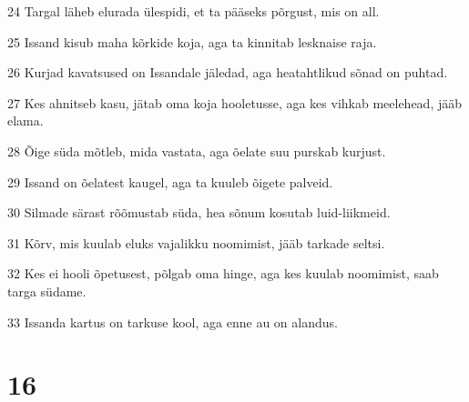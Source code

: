 \par 24 Targal läheb elurada ülespidi, et ta pääseks põrgust, mis on all.
\par 25 Issand kisub maha kõrkide koja, aga ta kinnitab lesknaise raja.
\par 26 Kurjad kavatsused on Issandale jäledad, aga heatahtlikud sõnad on puhtad.
\par 27 Kes ahnitseb kasu, jätab oma koja hooletusse, aga kes vihkab meelehead, jääb elama.
\par 28 Õige süda mõtleb, mida vastata, aga õelate suu purskab kurjust.
\par 29 Issand on õelatest kaugel, aga ta kuuleb õigete palveid.
\par 30 Silmade särast rõõmustab süda, hea sõnum kosutab luid-liikmeid.
\par 31 Kõrv, mis kuulab eluks vajalikku noomimist, jääb tarkade seltsi.
\par 32 Kes ei hooli õpetusest, põlgab oma hinge, aga kes kuulab noomimist, saab targa südame.
\par 33 Issanda kartus on tarkuse kool, aga enne au on alandus.

\chapter{16}

